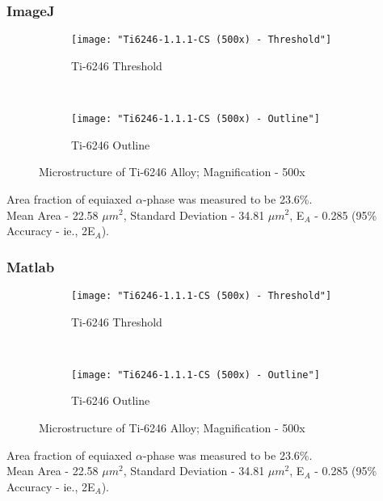 \subsubsection{ImageJ}
\begin{figure}[H]
    \centering
    \begin{subfigure}{0.49\textwidth}
        \texttt{[image: "Ti6246-1.1.1-CS (500x) - Threshold"]}
        \caption{Ti-6246 Threshold}
        \label{fig:Ti-6246 Threshold}
    \end{subfigure}
    ~
    \begin{subfigure}{0.49\textwidth}
        \texttt{[image: "Ti6246-1.1.1-CS (500x) - Outline"]}
        \caption{Ti-6246 Outline}
        \label{fig:Ti-6246 Outline}
    \end{subfigure}
  
    \caption{Microstructure of Ti-6246 Alloy; Magnification - 500x}
    \label{fig:As-Received-SEM}
\end{figure}

Area fraction of equiaxed $\alpha$-phase was measured to be 23.6\%.
\\
Mean Area - 22.58 $\mu m^{2}$, Standard Deviation - 34.81 $\mu m^{2}$, E$_{A}$ - 0.285 (95\% Accuracy - ie., 2E$_{A}$). 
\\

\subsubsection{Matlab}
\begin{figure}[H]
    \centering
    \begin{subfigure}{0.49\textwidth}
        \texttt{[image: "Ti6246-1.1.1-CS (500x) - Threshold"]}
        \caption{Ti-6246 Threshold}
        \label{fig:Ti-6246 Threshold}
    \end{subfigure}
    ~
    \begin{subfigure}{0.49\textwidth}
        \texttt{[image: "Ti6246-1.1.1-CS (500x) - Outline"]}
        \caption{Ti-6246 Outline}
        \label{fig:Ti-6246 Outline}
    \end{subfigure}
  
    \caption{Microstructure of Ti-6246 Alloy; Magnification - 500x}
    \label{fig:As-Received-SEM}
\end{figure}

Area fraction of equiaxed $\alpha$-phase was measured to be 23.6\%.
\\
Mean Area - 22.58 $\mu m^{2}$, Standard Deviation - 34.81 $\mu m^{2}$, E$_{A}$ - 0.285 (95\% Accuracy - ie., 2E$_{A}$). 
\\

